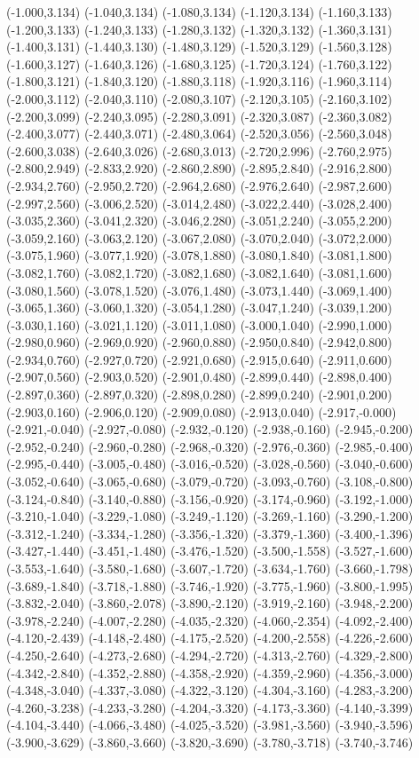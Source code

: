 (-1.000,3.134) (-1.040,3.134) (-1.080,3.134) (-1.120,3.134) (-1.160,3.133) (-1.200,3.133) (-1.240,3.133) (-1.280,3.132) (-1.320,3.132) (-1.360,3.131) (-1.400,3.131) (-1.440,3.130) (-1.480,3.129) (-1.520,3.129) (-1.560,3.128) (-1.600,3.127) (-1.640,3.126) (-1.680,3.125) (-1.720,3.124) (-1.760,3.122) (-1.800,3.121) (-1.840,3.120) (-1.880,3.118) (-1.920,3.116) (-1.960,3.114) (-2.000,3.112) (-2.040,3.110) (-2.080,3.107) (-2.120,3.105) (-2.160,3.102) (-2.200,3.099) (-2.240,3.095) (-2.280,3.091) (-2.320,3.087) (-2.360,3.082) (-2.400,3.077) (-2.440,3.071) (-2.480,3.064) (-2.520,3.056) (-2.560,3.048) (-2.600,3.038) (-2.640,3.026) (-2.680,3.013) (-2.720,2.996) (-2.760,2.975) (-2.800,2.949) (-2.833,2.920) (-2.860,2.890) (-2.895,2.840) (-2.916,2.800) (-2.934,2.760) (-2.950,2.720) (-2.964,2.680) (-2.976,2.640) (-2.987,2.600) (-2.997,2.560) (-3.006,2.520) (-3.014,2.480) (-3.022,2.440) (-3.028,2.400) (-3.035,2.360) (-3.041,2.320) (-3.046,2.280) (-3.051,2.240) (-3.055,2.200) (-3.059,2.160) (-3.063,2.120) (-3.067,2.080) (-3.070,2.040) (-3.072,2.000) (-3.075,1.960) (-3.077,1.920) (-3.078,1.880) (-3.080,1.840) (-3.081,1.800) (-3.082,1.760) (-3.082,1.720) (-3.082,1.680) (-3.082,1.640) (-3.081,1.600) (-3.080,1.560) (-3.078,1.520) (-3.076,1.480) (-3.073,1.440) (-3.069,1.400) (-3.065,1.360) (-3.060,1.320) (-3.054,1.280) (-3.047,1.240) (-3.039,1.200) (-3.030,1.160) (-3.021,1.120) (-3.011,1.080) (-3.000,1.040) (-2.990,1.000) (-2.980,0.960) (-2.969,0.920) (-2.960,0.880) (-2.950,0.840) (-2.942,0.800) (-2.934,0.760) (-2.927,0.720) (-2.921,0.680) (-2.915,0.640) (-2.911,0.600) (-2.907,0.560) (-2.903,0.520) (-2.901,0.480) (-2.899,0.440) (-2.898,0.400) (-2.897,0.360) (-2.897,0.320) (-2.898,0.280) (-2.899,0.240) (-2.901,0.200) (-2.903,0.160) (-2.906,0.120) (-2.909,0.080) (-2.913,0.040) (-2.917,-0.000) (-2.921,-0.040) (-2.927,-0.080) (-2.932,-0.120) (-2.938,-0.160) (-2.945,-0.200) (-2.952,-0.240) (-2.960,-0.280) (-2.968,-0.320) (-2.976,-0.360) (-2.985,-0.400) (-2.995,-0.440) (-3.005,-0.480) (-3.016,-0.520) (-3.028,-0.560) (-3.040,-0.600) (-3.052,-0.640) (-3.065,-0.680) (-3.079,-0.720) (-3.093,-0.760) (-3.108,-0.800) (-3.124,-0.840) (-3.140,-0.880) (-3.156,-0.920) (-3.174,-0.960) (-3.192,-1.000) (-3.210,-1.040) (-3.229,-1.080) (-3.249,-1.120) (-3.269,-1.160) (-3.290,-1.200) (-3.312,-1.240) (-3.334,-1.280) (-3.356,-1.320) (-3.379,-1.360) (-3.400,-1.396) (-3.427,-1.440) (-3.451,-1.480) (-3.476,-1.520) (-3.500,-1.558) (-3.527,-1.600) (-3.553,-1.640) (-3.580,-1.680) (-3.607,-1.720) (-3.634,-1.760) (-3.660,-1.798) (-3.689,-1.840) (-3.718,-1.880) (-3.746,-1.920) (-3.775,-1.960) (-3.800,-1.995) (-3.832,-2.040) (-3.860,-2.078) (-3.890,-2.120) (-3.919,-2.160) (-3.948,-2.200) (-3.978,-2.240) (-4.007,-2.280) (-4.035,-2.320) (-4.060,-2.354) (-4.092,-2.400) (-4.120,-2.439) (-4.148,-2.480) (-4.175,-2.520) (-4.200,-2.558) (-4.226,-2.600) (-4.250,-2.640) (-4.273,-2.680) (-4.294,-2.720) (-4.313,-2.760) (-4.329,-2.800) (-4.342,-2.840) (-4.352,-2.880) (-4.358,-2.920) (-4.359,-2.960) (-4.356,-3.000) (-4.348,-3.040) (-4.337,-3.080) (-4.322,-3.120) (-4.304,-3.160) (-4.283,-3.200) (-4.260,-3.238) (-4.233,-3.280) (-4.204,-3.320) (-4.173,-3.360) (-4.140,-3.399) (-4.104,-3.440) (-4.066,-3.480) (-4.025,-3.520) (-3.981,-3.560) (-3.940,-3.596) (-3.900,-3.629) (-3.860,-3.660) (-3.820,-3.690) (-3.780,-3.718) (-3.740,-3.746) 